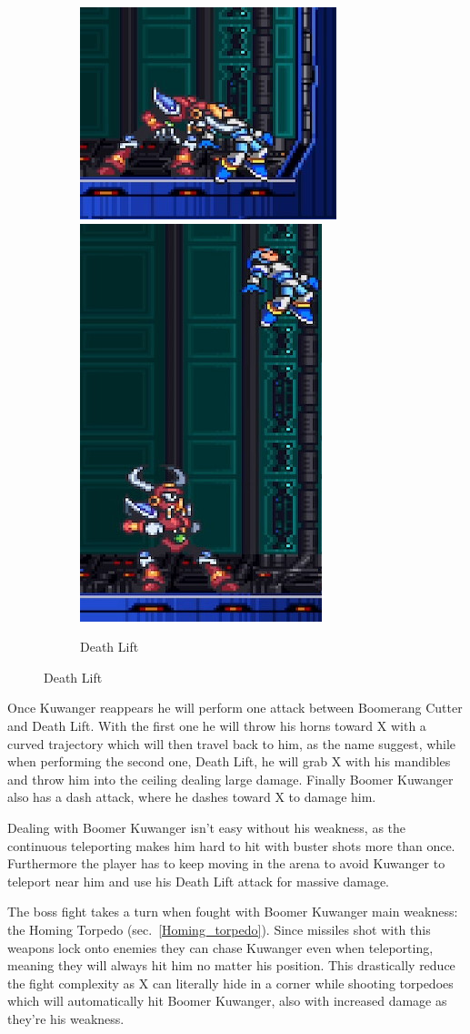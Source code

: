 \begin{figure}
	\ContinuedFloat
	\centering
	\begin{subfigure}{\linewidth}
		\centering
		\includegraphics[width=0.4\linewidth]{figures/X1/Boomer_kuwanger/Boomer_lift_1.jpg}
		\includegraphics[width=0.2\linewidth]{figures/X1/Boomer_kuwanger/Boomer_lift_2.jpg}
		\caption{Death Lift}
	\end{subfigure}
\end{figure}
Once Kuwanger reappears he will perform one attack between Boomerang Cutter and Death Lift. With the first one he will throw his horns toward X with a curved trajectory which will then travel back to him, as the name suggest, while when performing the second one, Death Lift, he will grab X with his mandibles and throw him into the ceiling dealing large damage. Finally Boomer Kuwanger also has a dash attack, where he dashes toward X to damage him.

Dealing with Boomer Kuwanger isn't easy without his weakness, as the continuous teleporting makes him hard to hit with buster shots more than once. Furthermore the player has to keep moving in the arena to avoid Kuwanger to teleport near him and use his Death Lift attack for massive damage.

The boss fight takes a turn when fought with Boomer Kuwanger main weakness: the Homing Torpedo (sec.~\ref{Homing_torpedo}). Since missiles shot with this weapons lock onto enemies they can chase Kuwanger even when teleporting, meaning they will always hit him no matter his position. This drastically reduce the fight complexity as X can literally hide in a corner while shooting torpedoes which will automatically hit Boomer Kuwanger, also with increased damage as they're his weakness.


